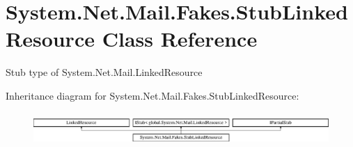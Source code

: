 \hypertarget{class_system_1_1_net_1_1_mail_1_1_fakes_1_1_stub_linked_resource}{\section{System.\-Net.\-Mail.\-Fakes.\-Stub\-Linked\-Resource Class Reference}
\label{class_system_1_1_net_1_1_mail_1_1_fakes_1_1_stub_linked_resource}
}


Stub type of System.\-Net.\-Mail.\-Linked\-Resource 


Inheritance diagram for System.\-Net.\-Mail.\-Fakes.\-Stub\-Linked\-Resource\-:\begin{figure}[H]
\begin{center}
\leavevmode
\includegraphics[height=1.261261cm]{class_system_1_1_net_1_1_mail_1_1_fakes_1_1_stub_linked_resource}
\end{center}
\end{figure}
